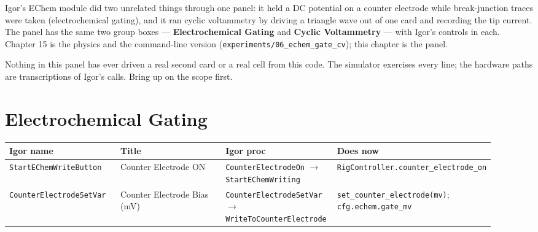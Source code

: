 Igor's EChem module did two unrelated things through one panel: it held a DC potential on a counter electrode while break-junction traces were taken (electrochemical gating), and it ran cyclic voltammetry by driving a triangle wave out of one card and recording the tip current. The panel has the same two group boxes --- \textbf{Electrochemical Gating} and \textbf{Cyclic Voltammetry} --- with Igor's controls in each. Chapter 15 is the physics and the command-line version (\texttt{experiments/\discretionary{}{}{}06\_\discretionary{}{}{}echem\_\discretionary{}{}{}gate\_\discretionary{}{}{}cv}); this chapter is the panel.

\begin{keybox}
Nothing in this panel has ever driven a real second card or a real cell from this code. The simulator exercises every line; the hardware paths are transcriptions of Igor's calls. Bring up on the scope first.
\end{keybox}

\section{Electrochemical Gating}

\small\setlength{\LTleft}{0pt}\setlength{\LTright}{\fill}
\begin{longtable}{@{}>{\raggedright\arraybackslash}p{0.230\linewidth}>{\raggedright\arraybackslash}p{0.230\linewidth}>{\raggedright\arraybackslash}p{0.230\linewidth}>{\raggedright\arraybackslash}p{0.230\linewidth}@{}}
\toprule
\textbf{Igor name} & \textbf{Title} & \textbf{Igor proc} & \textbf{Does now} \\
\midrule\endhead
\texttt{Start\discretionary{}{}{}EChem\discretionary{}{}{}Write\discretionary{}{}{}Button} & Counter Electrode ON & \texttt{Counter\discretionary{}{}{}Electrode\discretionary{}{}{}On} $\rightarrow$ \texttt{Start\discretionary{}{}{}EChem\discretionary{}{}{}Writing} & \texttt{Rig\discretionary{}{}{}Controller.\discretionary{}{}{}counter\_\discretionary{}{}{}electrode\_\discretionary{}{}{}on} \\
\texttt{Counter\discretionary{}{}{}Electrode\discretionary{}{}{}Set\discretionary{}{}{}Var} & Counter Electrode Bias (mV) & \texttt{Counter\discretionary{}{}{}Electrode\discretionary{}{}{}Set\discretionary{}{}{}Var} $\rightarrow$ \texttt{Write\discretionary{}{}{}To\discretionary{}{}{}Counter\discretionary{}{}{}Electrode} & \texttt{set\_\discretionary{}{}{}counter\_\discretionary{}{}{}electrode(mv)}; \texttt{cfg.\discretionary{}{}{}echem.\discretionary{}{}{}gate\_\discretionary{}{}{}mv} \\
\bottomrule
\end{longtable}
\normalsize

